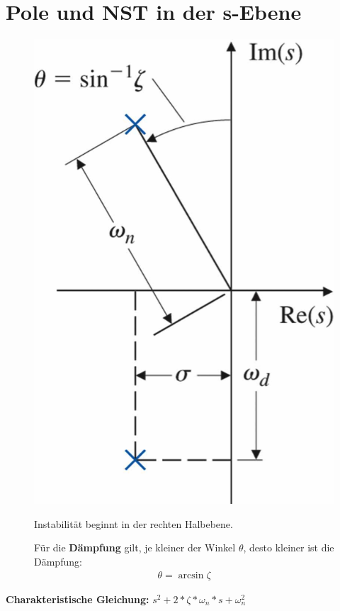\section{Pole und NST in der s-Ebene}
\begin{tcolorbox}[colback=white!10!white,colframe=green!30!black,title=PT$_2$ - Glied] 
	\begin{figure}[H]
		\begin{minipage}{.3\textwidth}
			\centering
			\includegraphics[width=1\textwidth]{content/img/winkel}
		\end{minipage}%
		\hspace{1cm}
		\begin{minipage}{.6\textwidth}
			Instabilität beginnt in der rechten Halbebene. 
			
			Für die  \textbf{Dämpfung} gilt, je kleiner der Winkel $\theta$, desto kleiner ist die Dämpfung: \begin{align*}
				\theta = \arcsin{\zeta}
			\end{align*}
		\end{minipage}%
		
	\end{figure}
	\textbf{Charakteristische Gleichung:} $s^2+2*\zeta*\omega_n*s+\omega_n^2$
\end{tcolorbox}

